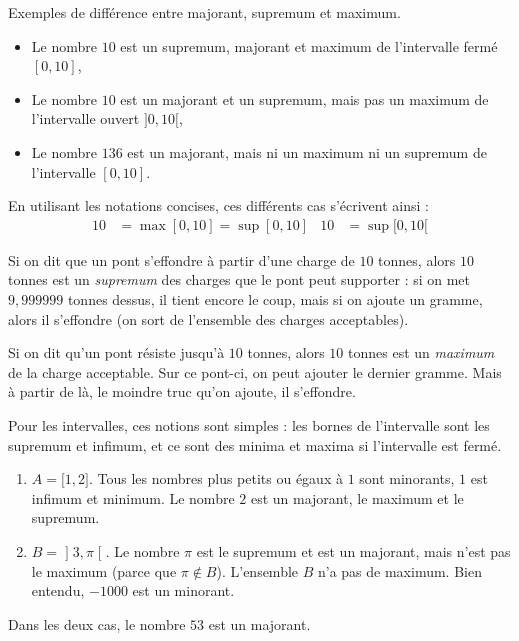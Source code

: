 \begin{example}
Exemples de différence entre majorant, supremum et maximum.
\begin{itemize}
\item Le nombre $10$ est un supremum, majorant et maximum de l'intervalle fermé $[0,10]$,
\item Le nombre $10$ est un majorant et un supremum, mais pas un maximum de l'intervalle ouvert $]0,10[$,
\item Le nombre $136$ est un majorant, mais ni un maximum ni un supremum de l'intervalle $[0,10]$.
\end{itemize}
\end{example}

En utilisant les notations concises, ces différents cas s'écrivent ainsi :
\begin{align*}
10&=\max[0,10]=\sup[0,10]	& 10&=\sup[0,10[
\end{align*}


\begin{example}
Si on dit que un pont s'effondre à partir d'une charge de $10$ tonnes, alors $10$ tonnes est un \emph{supremum} des charges que le pont peut supporter : si on met $9,999999$ tonnes dessus, il tient encore le coup, mais si on ajoute un gramme, alors il s'effondre (on sort de l'ensemble des charges acceptables).
\end{example}

\begin{example}
Si on dit qu'un pont résiste jusqu'à $10$ tonnes, alors $10$ tonnes est un \emph{maximum} de la charge acceptable. Sur ce pont-ci, on peut ajouter le dernier gramme. Mais à partir de là, le moindre truc qu'on ajoute, il s'effondre.
\end{example}



\begin{example}
	Pour les intervalles, ces notions sont simples : les bornes de l'intervalle sont les supremum et infimum, et ce sont des minima et maxima si l'intervalle est fermé.
	\begin{enumerate}
		\item
			$A=\mathopen[ 1 , 2 \mathclose]$. Tous les nombres plus petits ou égaux à $1$ sont minorants, $1$ est infimum et minimum. Le nombre $2$ est un majorant, le maximum et le supremum.
		\item
			$B=\mathopen] 3 , \pi \mathclose[$. Le nombre $\pi$ est le supremum et est un majorant, mais n'est pas le maximum (parce que $\pi\notin B$). L'ensemble $B$ n'a pas de maximum. Bien entendu, $-1000$ est un minorant.
	\end{enumerate}
    Dans les deux cas, le nombre $53$ est un majorant.
\end{example}

